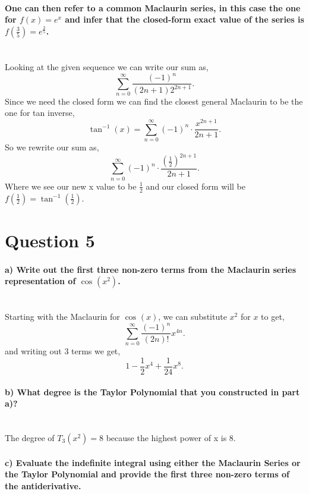 \documentclass{report}
\begin{document}
\paragraph{One can then refer to a common Maclaurin series, in this case the one for $ f\left( x \right) =e^{ x } $ and infer that the closed-form exact value of the series is $ f\left( \frac{ 3 }{ 5 }  \right) = e^{ \frac{ 3 }{ 5 }  } $.\\ \\ }
Looking at the given sequence we can write our sum as,
\[
\sum_{ n=0 } ^{ \infty } \frac{ \left( -1 \right) ^{ n } }{ \left( 2n+1 \right) 2^{ 2n+1 } }
.\] 
Since we need the closed form we can find the closest general Maclaurin to be the one for tan inverse,
\[
\tan^{ -1 } \left( x \right)  = \sum_{ n=0 } ^{ \infty } \left( -1 \right) ^{ n }\cdot \frac{ x^{ 2n+1 } }{ 2n+1 } 
.\] 
So we rewrite our sum as,
\[
\sum_{ n=0 } ^{ \infty } \left( -1 \right) ^{ n }\cdot \frac{ \left( \frac{ 1 }{ 2 }  \right) ^{ 2n+1 } }{ 2n+1 }
.\] 
Where we see our new x value to be $ \frac{ 1 }{ 2 }  $ and our closed form will be $ f\left( \frac{ 1 }{ 2 }  \right) =\tan^{ -1 } \left( \frac{ 1 }{ 2 }  \right)  $.
\section*{Question 5}%
\label{sec:Question 5}
\paragraph{a) Write out the first three non-zero terms from the Maclaurin series representation of $ \cos^{  } \left( x^2 \right)  $. \\ \\}
Starting with the Maclaurin for $ \cos^{  } \left( x \right)  $, we can substitute $ x^2 $ for $ x $ to get,
\[
\sum_{ n=0 } ^{ \infty } \frac{ \left( -1 \right) ^{ n } }{ \left( 2n \right) ! }x^{ 4n }
.\] 
and writing out 3 terms we get,
\[
1 - \frac{ 1 }{ 2 } x^{ 4 } + \frac{ 1 }{ 24 } x^{ 8 }
.\] 
\paragraph{b) What degree is the Taylor Polynomial that you constructed in part a)? \\ \\ }
The degree of $ T_3\left( x^2 \right) = 8 $ because the highest power of x is 8. 
\paragraph{c) Evaluate the indefinite integral using either the Maclaurin Series or the Taylor Polynomial and provide the first three non-zero terms of the antiderivative.}
\end{document}
